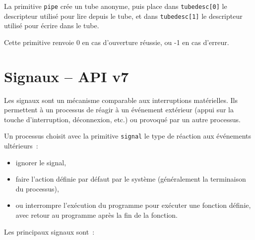 \documentclass [twoside] {report}
\begin{document}
La primitive \texttt {pipe} crée un tube anonyme,
puis place dans \texttt {tubedesc[0]}
le descripteur utilisé pour lire depuis le tube, et dans
\texttt {tubedesc[1]} le descripteur utilisé pour écrire dans le tube.

Cette primitive renvoie 0 en cas d'ouverture
réussie, ou -1 en cas d'erreur.






\section {Signaux -- API v7}


Les signaux sont un mécanisme comparable aux interruptions
matérielles. Ils permettent à un processus de réagir à un
événement extérieur (appui sur la touche d'interruption,
déconnexion, etc.) ou provoqué par un autre processus.

Un processus choisit avec la primitive \texttt {signal}
le type de réaction aux événements ultérieurs~:

\begin {itemize}
    \item ignorer le signal,
    \item faire l'action définie par défaut par le
	système (généralement la terminaison du processus),
    \item ou interrompre l'exécution du programme pour exécuter
	une fonction définie, avec retour au programme après
	la fin de la fonction.
\end {itemize}

Les principaux signaux sont~:
\end{document}
